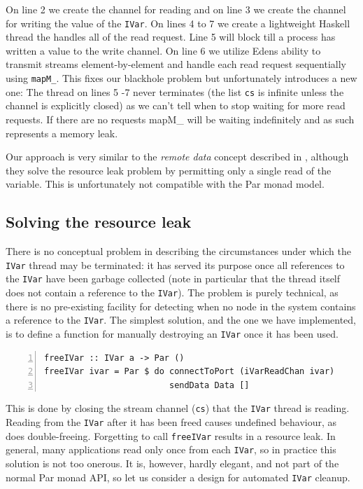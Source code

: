 \documentclass[a4paper, oneside, final]{memoir}
\begin{document}
On line 2 we create the channel for reading and on line 3 we create
the channel for writing the value of the \texttt{IVar}. On lines 4 to
7 we create a lightweight Haskell thread the handles all of the read
request. Line 5 will block till a process has written a value to the
write channel. On line 6 we utilize Edens ability to transmit streams
element-by-element and handle each read request sequentially using
\texttt{mapM\_}. This fixes our blackhole problem but unfortunately
introduces a new one: The thread on lines 5 -7 never terminates (the
list \texttt{cs} is infinite unless the channel is explicitly closed)
as we can't tell when to stop waiting for more read requests. If there
are no requests mapM\_ will be waiting indefinitely and as such
represents a memory leak.

Our approach is very similar to the \textit{remote data} concept
described in \cite{remotedata}, although they solve the resource leak
problem by permitting only a single read of the variable.  This is
unfortunately not compatible with the Par monad model.

\subsection{Solving the resource leak}

There is no conceptual problem in describing the circumstances under
which the \texttt{IVar} thread may be terminated: it has served its
purpose once all references to the \texttt{IVar} have been garbage
collected (note in particular that the thread itself does not contain
a reference to the \texttt{IVar}).  The problem is purely technical,
as there is no pre-existing facility for detecting when no node in the
system contains a reference to the \texttt{IVar}.  The simplest
solution, and the one we have implemented, is to define a function for
manually destroying an \texttt{IVar} once it has been used.

\begin{lstlisting}[numbers=left, numberstyle=\tiny]
freeIVar :: IVar a -> Par ()
freeIVar ivar = Par $ do connectToPort (iVarReadChan ivar)
                         sendData Data []
\end{lstlisting}

This is done by closing the stream channel (\texttt{cs}) that the
\texttt{IVar} thread is reading.  Reading from the \texttt{IVar} after
it has been freed causes undefined behaviour, as does double-freeing.
Forgetting to call \texttt{freeIVar} results in a resource leak.  In
general, many applications read only once from each \texttt{IVar}, so
in practice this solution is not too onerous.  It is, however, hardly
elegant, and not part of the normal Par monad API, so let us consider
a design for automated \texttt{IVar} cleanup.
\end{document}
